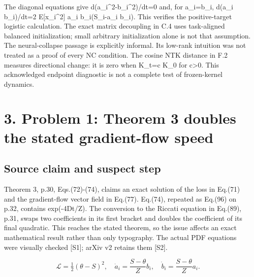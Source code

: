 \documentclass[10pt]{article}
\begin{document}
The diagonal equations give d(a\_i\textasciicircum{}2-b\_i\textasciicircum{}2)/dt=0 and, for a\_i=b\_i, d(a\_i b\_i)/dt=2 E[x\_i\textasciicircum{}2] a\_i b\_i(S\_i-a\_i b\_i). This verifies the positive-target logistic calculation. The exact matrix decoupling in C.4 uses task-aligned balanced initialization; small arbitrary initialization alone is not that assumption. The neural-collapse passage is explicitly informal. Its low-rank intuition was not treated as a proof of every NC condition. The cosine NTK distance in F.2 measures directional change: it is zero when K\_t=c K\_0 for c>0. This acknowledged endpoint diagnostic is not a complete test of frozen-kernel dynamics.\par
\section*{3. Problem 1: Theorem 3 doubles the stated gradient-flow speed}
\subsection*{Source claim and suspect step}
Theorem 3, p.30, Eqs.(72)-(74), claims an exact solution of the loss in Eq.(71) and the gradient-flow vector field in Eq.(77). Eq.(74), repeated as Eq.(96) on p.32, contains exp(-4Dt/Z). The conversion to the Riccati equation in Eq.(89), p.31, swaps two coefficients in its first bracket and doubles the coefficient of its final quadratic. This reaches the stated theorem, so the issue affects an exact mathematical result rather than only typography. The actual PDF equations were visually checked [S1]; arXiv v2 retains them [S2].\par
\[\mathcal L=\tfrac12(\theta-S)^2,\quad
\dot a_i=\frac{S-\theta}{Z}b_i,\quad
\dot b_i=\frac{S-\theta}{Z}a_i.\]\par
\end{document}
